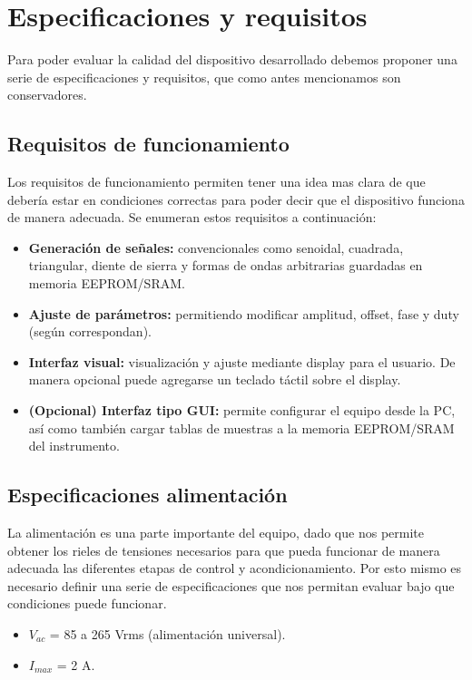 \section{Especificaciones y requisitos}
Para poder evaluar la calidad del dispositivo desarrollado debemos proponer una serie de especificaciones y requisitos, que como antes mencionamos son conservadores.

\subsection{Requisitos de funcionamiento} 
Los requisitos de funcionamiento permiten tener una idea mas clara de que debería estar en condiciones correctas para poder decir que el dispositivo funciona de manera adecuada. Se enumeran estos requisitos a continuación:

\begin{itemize}
	\item \textbf{Generación de señales:} convencionales como senoidal, cuadrada, triangular, diente de sierra y formas de ondas arbitrarias guardadas en memoria EEPROM/SRAM.
	
	\item \textbf{Ajuste de parámetros:} permitiendo modificar amplitud, offset, fase y duty (según correspondan).
	
	\item \textbf{Interfaz visual:} visualización y ajuste mediante display para el usuario. De manera opcional puede agregarse un teclado táctil sobre el display.
	
	\item \textbf{(Opcional) Interfaz tipo GUI:} permite configurar el equipo desde la PC, así como también cargar tablas de muestras a la memoria EEPROM/SRAM del instrumento.
\end{itemize}

\subsection{Especificaciones alimentación}
La alimentación es una parte importante del equipo, dado que nos permite obtener los rieles de tensiones necesarios para que pueda funcionar de manera adecuada las diferentes etapas de control y acondicionamiento. Por esto mismo es necesario definir una serie de especificaciones que nos permitan evaluar bajo que condiciones puede funcionar. 

\begin{itemize}
	\item $V_{ac}$ = 85 a 265 Vrms (alimentación universal).
	
	\item $I_{max}$ = 2 A.
\end{itemize}

